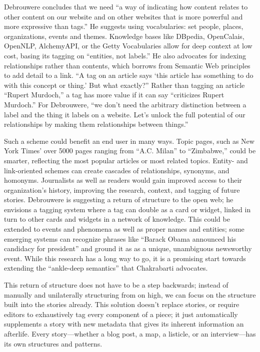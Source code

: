 Debrouwere concludes that we need ``a way of indicating how content relates to other content on our website and on other websites that is more powerful and more expressive than tags.'' He suggests using vocabularies: set people, places, organizations, events and themes. Knowledge bases like DBpedia, OpenCalais, OpenNLP, AlchemyAPI, or the Getty Vocabularies allow for deep context at low cost, basing its tagging on ``entities, not labels.'' He also advocates for indexing relationships rather than contents, which borrows from Semantic Web principles to add detail to a link. ``A tag on an article says `this article has something to do with this concept or thing.' But what exactly?'' Rather than tagging an article ``Rupert Murdoch,'' a tag has more value if it can say ``criticizes Rupert Murdoch.'' For Debrouwere, ``we don't need the arbitrary distinction between a label and the thing it labels on a website. Let's unlock the full potential of our relationships by making them relationships between things.''

Such a scheme could benefit an end user in many ways. Topic pages, such as New York Times' over 5000 pages ranging from ``A.C. Milan'' to ``Zimbabwe,'' could be smarter, reflecting the most popular articles or most related topics. Entity- and link-oriented schemes can create cascades of relationships, synonyms, and homonyms. Journalists as well as readers would gain improved access to their organization's history, improving the research, context, and tagging of future stories. Debrouwere is suggesting a return of structure to the open web; he envisions a tagging system where a tag can double as a card or widget, linked in turn to other cards and widgets in a network of knowledge. This could be extended to events and phenomena as well as proper names and entities; some emerging systems can recognize phrases like ``Barack Obama announced his candidacy for president'' and ground it as as a unique, unambiguous newsworthy event.\autocite{nothman_grounding_2013} While this research has a long way to go, it is a promising start towards extending the ``ankle-deep semantics'' that Chakrabarti advocates.\autocite[289]{chakrabarti_mining_2003}

This return of structure does not have to be a step backwards; instead of manually and unilaterally structuring from on high, we can focus on the structure built into the stories already. This solution doesn't replace stories, or require editors to exhaustively tag every component of a piece; it just automatically supplements a story with new metadata that gives its inherent information an afterlife. Every story---whether a blog post, a map, a listicle, or an interview---has its own structures and patterns.


